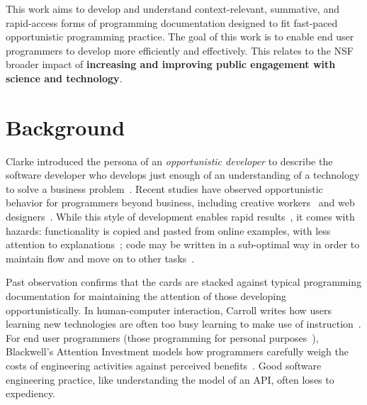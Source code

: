\documentclass[12pt]{memoir}
\title{}
\author{Andrew Head}
\begin{document}


This work aims to develop and understand context-relevant, summative, and rapid-access forms of programming documentation designed to fit fast-paced opportunistic programming practice.
The goal of this work is to enable end user programmers to develop more efficiently and effectively.
This relates to the NSF broader impact of \textbf{increasing and improving public engagement with science and technology}.

\section{Background}

Clarke introduced the persona of an \emph{opportunistic developer} to describe the software developer who develops just enough of an understanding of a technology to solve a business problem~\cite{clarke_what_2007}.
Recent studies have observed opportunistic behavior for programmers beyond business, including creative workers~\cite{brandt_opportunistic_2008} and web designers~\cite{dorn_learning_2010}.
While this style of development enables rapid results~\cite{brandt_opportunistic_2008}, it comes with hazards:
functionality is copied and pasted from online examples, with less attention to explanations~\cite{brandt_two_2009};
code may be written in a sub-optimal way in order to maintain flow and move on to other tasks~\cite{brandt_opportunistic_2008}.

Past observation confirms that the cards are stacked against typical programming documentation for maintaining the attention of those developing opportunistically.
In human-computer interaction, Carroll writes how users learning new technologies are often too busy learning to make use of instruction~\cite{carroll_nurnberg_1990}.
For end user programmers (those programming for personal purposes~\cite{ko_state_2011}), Blackwell's Attention Investment models how programmers carefully weigh the costs of engineering activities against perceived benefits~\cite{blackwell_psychological_2006}.
Good software engineering practice, like understanding the model of an API, often loses to expediency.
\end{document}
